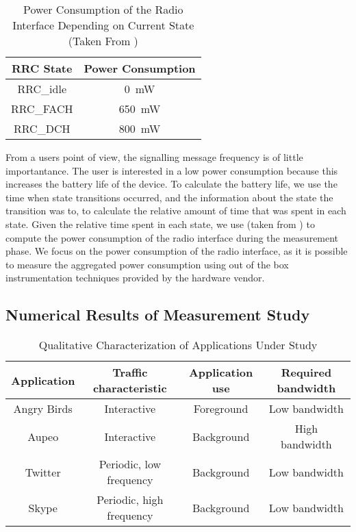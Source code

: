 \begin{table}
  \centering
  \begin{tabular}{c|c}
    \gls{RRC} State & Power Consumption\\
    \hline
    \gls{RRC_idle} & \SI{0}{\milli\watt}\\
    \gls{RRC_FACH} & \SI{650}{\milli\watt}\\
    \gls{RRC_DCH} & \SI{800}{\milli\watt}
  \end{tabular}
  \caption{Power Consumption of the  Radio Interface Depending on Current  State (Taken From \cite{Qian2011})}
  \label{tab:network:network_traces:calculating_metrics:power_consumption}	
\end{table}

From a users point of view, the signalling message frequency is of little importantance.
The user is interested in a low power consumption because this increases the battery life of the device.
To calculate the battery life, we use the time when state transitions occurred, and the information about the state the transition was to, to calculate the relative amount of time that was spent in each state.
Given the relative time spent in each state, we use  (taken from \cite{Qian2011}) to compute the power consumption of the radio interface during the measurement phase.
We focus on the power consumption of the radio interface, as it is possible to measure the aggregated power consumption using out of the box instrumentation techniques provided by the hardware vendor.

\subsection{Numerical Results of Measurement Study}\label{sec:network:network_traces:numerical_results}
\begin{table}
  \centering
  \begin{tabular}{c|c|c|c}
    Application&Traffic characteristic&Application use&Required bandwidth\\
    \hline
    Angry Birds & Interactive & Foreground & Low bandwidth \\
    Aupeo & Interactive & Background & High bandwidth\\
    Twitter & Periodic, low frequency & Background & Low bandwidth\\
    Skype & Periodic, high frequency& Background & Low bandwidth
  \end{tabular}
  \caption{Qualitative Characterization of Applications Under Study}
  \label{tab:network:network_traces:numerical_results:app_characterization}
\end{table}

